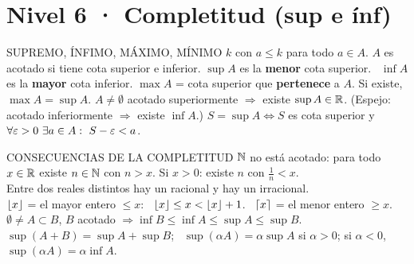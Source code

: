 \section*{Nivel 6 · Completitud (sup e ínf)}
\begin{sello}{SUPREMO, ÍNFIMO, MÁXIMO, MÍNIMO}
 $k$ con $a\le k$ para todo $a\in A$. $A$ es acotado si tiene cota superior e inferior.
 $\sup A$ es la \textbf{menor} cota superior. \ $\inf A$ es la \textbf{mayor} cota inferior.
 $\max A$ = cota superior que \textbf{pertenece} a $A$. Si existe, $\max A=\sup A$.
 $A\neq\emptyset$ acotado superiormente $\Rightarrow$ existe $\sup A\in\mathbb{R}$. (Espejo: acotado inferiormente $\Rightarrow$ existe $\inf A$.)
 $S=\sup A\iff S$ es cota superior y $\forall\varepsilon>0\ \exists a\in A:\ S-\varepsilon<a$.
\end{sello}
\begin{memo}{CONSECUENCIAS DE LA COMPLETITUD}
 $\mathbb{N}$ no está acotado: para todo $x\in\mathbb{R}$ existe $n\in\mathbb{N}$ con $n>x$. Si $x>0$: existe $n$ con $\frac1n<x$.\\
 Entre dos reales distintos hay un racional y hay un irracional.\\
 $\lfloor x\rfloor$ = el mayor entero $\le x$: \ $\lfloor x\rfloor\le x<\lfloor x\rfloor+1$. \ $\lceil x\rceil$ = el menor entero $\ge x$.\\
 $\emptyset\neq A\subset B$, $B$ acotado $\Rightarrow\inf B\le\inf A\le\sup A\le\sup B$.\\
 $\sup(A+B)=\sup A+\sup B$; \ $\sup(\alpha A)=\alpha\sup A$ si $\alpha>0$; si $\alpha<0$, $\sup(\alpha A)=\alpha\inf A$.
\end{memo}

